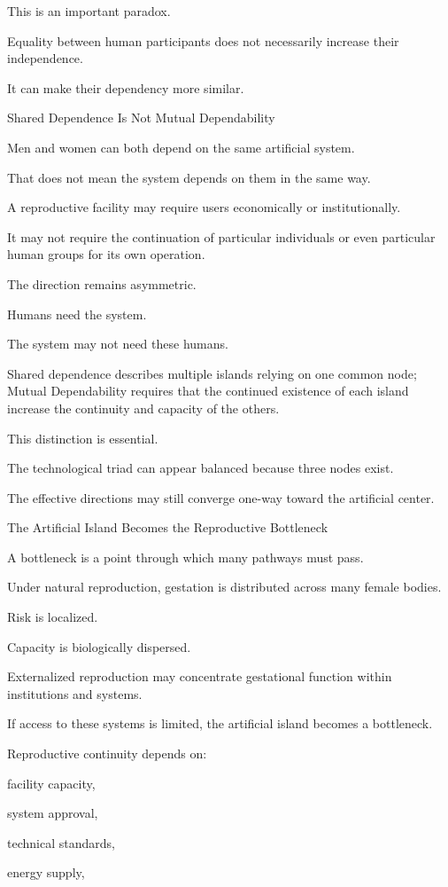 This is an important paradox.

Equality between human participants does not necessarily increase their independence.

It can make their dependency more similar.

Shared Dependence Is Not Mutual Dependability

Men and women can both depend on the same artificial system.

That does not mean the system depends on them in the same way.

A reproductive facility may require users economically or institutionally.

It may not require the continuation of particular individuals or even particular human groups for its own operation.

The direction remains asymmetric.

Humans need the system.

The system may not need these humans.

Shared dependence describes multiple islands relying on one common node; Mutual Dependability requires that the continued existence of each island increase the continuity and capacity of the others.

This distinction is essential.

The technological triad can appear balanced because three nodes exist.

The effective directions may still converge one-way toward the artificial center.

The Artificial Island Becomes the Reproductive Bottleneck

A bottleneck is a point through which many pathways must pass.

Under natural reproduction, gestation is distributed across many female bodies.

Risk is localized.

Capacity is biologically dispersed.

Externalized reproduction may concentrate gestational function within institutions and systems.

If access to these systems is limited, the artificial island becomes a bottleneck.

Reproductive continuity depends on:

facility capacity,

system approval,

technical standards,

energy supply,


